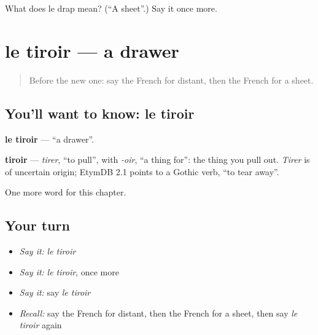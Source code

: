 \begin{tcolorbox}[breakable,colback=teal!4,colframe=teal!35!black,title={Before you move on}]
What does le drap mean? (\textquotedblleft{}A sheet\textquotedblright{}.) Say it once more.
\end{tcolorbox}
\section[le tiroir]{le tiroir — a drawer}

\label{lesson:FR-C193-tiroir}



\begin{quote}
Before the new one: say the French for distant, then the French for a sheet.
\end{quote}

\subsection*{You'll want to know: le tiroir}
\textbf{le tiroir} — \textquotedblleft{}a drawer\textquotedblright{}.

\begin{cousinweb}
\textbf{tiroir} — \emph{tirer}, \textquotedblleft{}to pull\textquotedblright{}, with \emph{-oir}, \textquotedblleft{}a thing for\textquotedblright{}: the thing you pull out. \emph{Tirer} is of uncertain origin; EtymDB 2.1 points to a Gothic verb, \textquotedblleft{}to tear away\textquotedblright{}.
\end{cousinweb}

\begin{grammarlens}[title={What you've built}]
One more word for this chapter.
\end{grammarlens}

\subsection*{Your turn}
\begin{itemize}
\raggedright
  \item \emph{Say it:} \emph{le tiroir}
  \item \emph{Say it:} \emph{le tiroir}, once more
  \item \emph{Say it:} say \emph{le tiroir}
  \item \emph{Recall:} say the French for distant, then the French for a sheet, then say \emph{le tiroir} again
\end{itemize}

